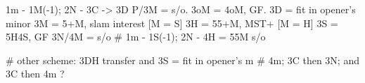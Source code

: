 1m - 1M(-1); 2N -
3C -> 3D
    P/3M = s/o. 3oM = 4oM, GF.
3D = fit in opener's minor
3M = 5+M, slam interest
[M = S] 3H = 55+M, MST+
[M = H] 3S = 5H4S, GF
3N/4M = s/o  # 1m - 1S(-1); 2N - 4H = 55M s/o

# other scheme: 3DH transfer and 3S = fit in opener's m
# 4m; 3C then 3N; and 3C then 4m ?